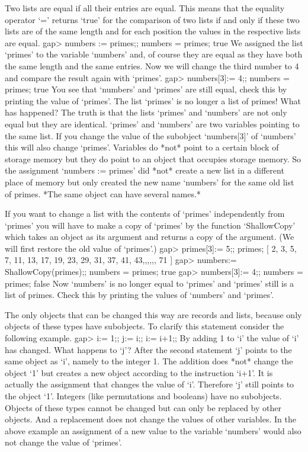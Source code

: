 Two  lists are equal if all their entries are equal.  This means that the
equality operator `=' returns `true' for the  comparison of  two lists if
and  only if these two lists are of the same length and for each position
the values in the respective lists are equal.
\beginexample
    gap> numbers := primes;; numbers = primes;
    true 
\endexample
We assigned  the  list `primes' to the variable  `numbers' and, of course
they are equal as they have  both  the same length  and the same entries.
Now we  will change the  third number to  4 and  compare the result again
with `primes'.
\beginexample
    gap> numbers[3]:= 4;; numbers = primes;
    true 
\endexample
You  see that  `numbers' and  `primes'  are still   equal, check this  by
printing the value of `primes'. The list `primes' is  no longer a list of
primes! What has  happened?  The truth is  that  the  lists  `primes' and
`numbers' are  not  only  equal but  they  are  identical.  `primes'  and
`numbers' are two variables pointing to the  same list. If you change the
value of  the subobject `numbers[3]'  of `numbers' this will  also change
`primes'.  Variables do *not* point to  a certain block of storage memory
but they do  point  to an object that  occupies  storage memory.   So the
assignment `numbers := primes' did *not* create a new list in a different
place of memory but only created the new name `numbers'  for the same old
list of primes. *The same object can have several names.*

If you want to change a list with the  contents of `primes' independently
from `primes'  you will have to  make a copy of  `primes' by the function
`ShallowCopy' which takes an object as its argument and returns a copy of
the argument. (We will first restore the old value of `primes'.)
\beginexample
    gap> primes[3]:= 5;; primes;
    [ 2, 3, 5, 7, 11, 13, 17, 19, 23, 29, 31, 37, 41, 43,,,,,, 71 ]
    gap> numbers:= ShallowCopy(primes);; numbers = primes;
    true
    gap> numbers[3]:= 4;; numbers = primes;
    false 
\endexample
Now `numbers' is no longer equal to `primes' and `primes' still is a list
of primes.  Check this by printing the values of `numbers' and `primes'.

The  only objects  that can be  changed  this way  are records and lists,
because only {\GAP} objects of  these  types have subobjects.  To clarify
this statement consider the following example.
\beginexample
    gap> i:= 1;; j:= i;; i:= i+1;; 
\endexample
By adding 1 to `i' the value of `i' has  changed.   What  happens to `j'?
After the second statement `j' points to the same object  as `i',  namely
to the  integer 1.  The  addition  does *not* change  the object `1'  but
creates a new object according  to the instruction `i+1'.  It is actually
the assignment that changes the value of `i'.  Therefore `j' still points
to  the object `1'.  Integers  (like permutations and  booleans)  have no
subobjects.  Objects  of these types  cannot  be  changed but can only be
replaced by other objects.   And a replacement does not change the values
of other variables.  In the above example an assignment of a new value to
the variable `numbers' would also not change the value of `primes'.

